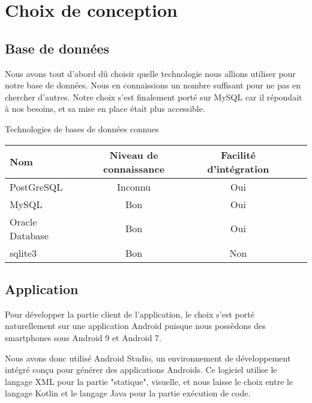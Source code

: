 \section{Choix de conception}

\subsection{Base de données}
Nous avons tout d'abord dû choisir quelle technologie nous allions utiliser pour notre base de données.
Nous en connaissions un nombre suffisant pour ne pas en chercher d'autres. Notre choix s'est finalement porté sur MySQL car il répondait à nos besoins, et sa mise en place était plus accessible.
\par
\begin{center}
    Technologies de bases de données connues
    \par
    \begin{tabular}{|l|c|c|c|c|}
        \hline
        Nom & Niveau de connaissance & Facilité d'intégration \\
        \hline
        PostGreSQL & Inconnu & Oui\\
        \hline
        MySQL & Bon & Oui \\
        \hline
        Oracle Database & Bon & Oui\\
        \hline
        sqlite3 & Bon & Non\\
        \hline
    \end{tabular}
\end{center}


\subsection{Application}
Pour développer la partie client de l'application, le choix s'est porté naturellement sur une application Android puisque nous possèdons des
smartphones sous Android 9 et Android 7. 
\par
Nous avons donc utilisé Android Studio, un environnement de développement intégré conçu pour générer
des applications Androids. Ce logiciel utilise le langage XML pour la partie "statique", visuelle, et nous laisse le choix entre le langage
Kotlin et le langage Java pour la partie exécution de code.
